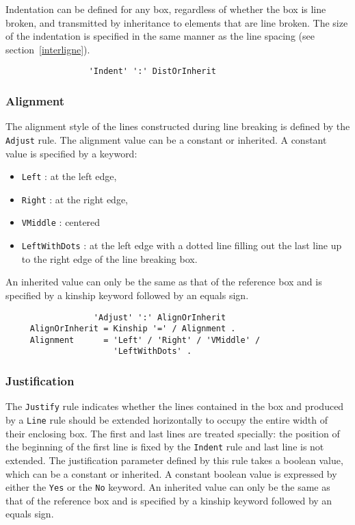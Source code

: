 Indentation can be defined for any box, regardless of whether the box
is line broken, and transmitted by inheritance to elements that are
line broken.  The size of the indentation is specified in the same
manner as the line spacing (see section~\ref{interligne}).

\begin{verbatim}
                 'Indent' ':' DistOrInherit
\end{verbatim}

\subsubsection{Alignment}

The alignment style of the lines constructed during line breaking is
defined by the {\tt Adjust} rule.  The alignment value can be a
constant or inherited.  A constant value is specified by a keyword:
\begin{itemize}
   \item {\tt Left} : at the left edge,
   \item {\tt Right} : at the right edge,
   \item {\tt VMiddle} : centered
   \item {\tt LeftWithDots} : at the left edge with a dotted line
filling out the last line up to the right edge of the line breaking box.
\end{itemize}

An inherited value can only be the same as that of the reference box
and is specified by a kinship keyword followed by an equals sign.

\begin{verbatim}
                  'Adjust' ':' AlignOrInherit
     AlignOrInherit = Kinship '=' / Alignment .
     Alignment      = 'Left' / 'Right' / 'VMiddle' /
                      'LeftWithDots' .
\end{verbatim}

\subsubsection{Justification}

The {\tt Justify} rule indicates whether the lines contained in the
box and produced by a {\tt Line} rule should be extended horizontally
to occupy the entire width of their enclosing box.  The first and last
lines are treated specially: the position of the beginning of the
first line is fixed by the {\tt Indent} rule and last line is not
extended.  The justification parameter defined by this rule takes a
boolean value, which can be a constant or inherited.  A constant
boolean value is expressed by either the {\tt Yes} or the {\tt No}
keyword.  An inherited value can only be the same as that of the
reference box and is specified by a kinship keyword followed by an
equals sign.

